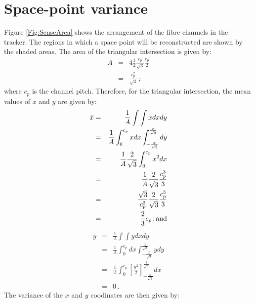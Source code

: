\section{Space-point variance}
\label{App:SciFiSpcPntSD}

Figure \ref{Fig:SenseArea} shows the arrangement of the fibre channels in
the tracker.
The regions in which a space point will be reconstructed are shown by
the shaded areas.
The area of the triangular intersection is given by:
\begin{eqnarray}
  A & = & 4 \frac{1}{2} \frac{c_p}{\sqrt{3}} \frac{c_p}{2} \\
    & = & \frac{c_p^{2}}{\sqrt{3}} \, ;
\end{eqnarray}
where $c_p$ is the channel pitch.
Therefore, for the triangular intersection, the mean values of $x$ and
$y$ are given by:
\begin{eqnarray}
  \bar{x} & = & \frac{1}{A} \int \int x dx dy                           \\
          & = & \frac{1}{A} \int_{0}^{c_p} x dx                         
                \int_{-\frac{x}{\sqrt{3}}}^{\frac{x}{\sqrt{3}}} dy                \\
          & = & \frac{1}{A} \frac{2}{\sqrt{3}} \int_{0}^{c_p} x^{2} dx   \\
          & = & \frac{1}{A} \frac{2}{\sqrt{3}} \frac{c_p^{3}}{3}        \\
          & = & \frac{\sqrt{3}}{c_p^2} \frac{2}{\sqrt{3}} \frac{c_p^{3}}{3}  \\
          & = & \frac{2}{3}c_p \, {\rm ; and}
\end{eqnarray}
\begin{eqnarray}
  \bar{y}&=&\frac{1}{A} \int \int y dx dy                            \\
         &=&\frac{1}{A} \int_{0}^{c_p} dx                            
            \int_{-\frac{x}{\sqrt{3}}}^{\frac{x}{\sqrt{3}}} y dy               \\
         &=&\frac{1}{A}  \int_{0}^{c_p} 
            \left[ \frac{y^{2}}{2} \right]_{-\frac{x}{\sqrt{3}}}^{\frac{x}{\sqrt{3}}} dx \\
         &=&0 \, .
\end{eqnarray}
The variance of the $x$ and $y$ coodinates are then given by:
